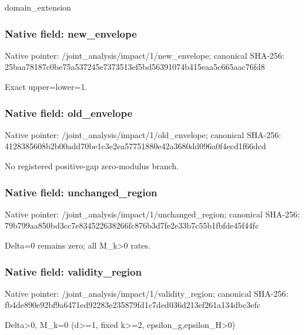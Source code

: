 \documentclass[10pt,a4paper]{article}
\begin{document}
\begingroup\raggedright\sloppy domain\_\allowbreak{}extension\par\endgroup

\subsubsection{Native field: new\_\allowbreak{}envelope}
Native pointer: /joint\_\allowbreak{}analysis/impact/1/new\_\allowbreak{}envelope; canonical SHA-256: 25baa78187c0be75a537245e7373513ef5bd56391074b415eaa5c665aac76fd8

\begingroup\raggedright\sloppy Exact upper=\allowbreak{}lower=\allowbreak{}1.\par\endgroup

\subsubsection{Native field: old\_\allowbreak{}envelope}
Native pointer: /joint\_\allowbreak{}analysis/impact/1/old\_\allowbreak{}envelope; canonical SHA-256: 4128385608b2b00add70be1c3e2ea57751880e42a3680dd096a0f4ecd1f66dcd

\begingroup\raggedright\sloppy No registered positive-gap zero-modulus branch.\par\endgroup

\subsubsection{Native field: unchanged\_\allowbreak{}region}
Native pointer: /joint\_\allowbreak{}analysis/impact/1/unchanged\_\allowbreak{}region; canonical SHA-256: 79b799aa850bd3cc7e834522638266fc876b3d7fe2e33b7c55b1fbfde45f44fc

\begingroup\raggedright\sloppy Delta=\allowbreak{}0 remains zero;\allowbreak{} all M\_\allowbreak{}k>0 rates.\par\endgroup

\subsubsection{Native field: validity\_\allowbreak{}region}
Native pointer: /joint\_\allowbreak{}analysis/impact/1/validity\_\allowbreak{}region; canonical SHA-256: fb4de890e92bf9a6471ed92283e235879fd1c7ded036d213ef261a134dbc3efc

\begingroup\raggedright\sloppy Delta>0,\allowbreak{} M\_\allowbreak{}k=\allowbreak{}0 (d>=\allowbreak{}1,\allowbreak{} fixed k>=\allowbreak{}2,\allowbreak{} epsilon\_\allowbreak{}g,\allowbreak{}epsilon\_\allowbreak{}H>0)\par\endgroup
\end{document}
